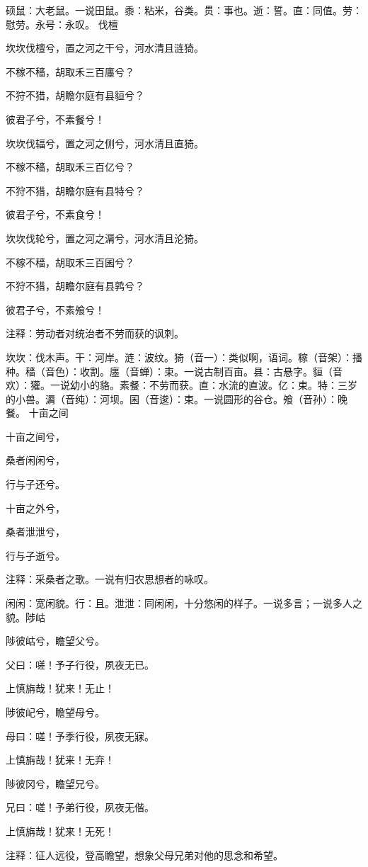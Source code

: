 \documentclass[12pt,UTF8]{ctexbook}
\begin{document}
硕鼠：大老鼠。一说田鼠。黍：粘米，谷类。贯：事也。逝：誓。直：同值。劳：慰劳。永号：永叹。 伐檀

坎坎伐檀兮，置之河之干兮，河水清且涟猗。

不稼不穑，胡取禾三百廛兮？

不狩不猎，胡瞻尔庭有县貆兮？

彼君子兮，不素餐兮！

坎坎伐辐兮，置之河之侧兮，河水清且直猗。

不稼不穑，胡取禾三百亿兮？

不狩不猎，胡瞻尔庭有县特兮？

彼君子兮，不素食兮！

坎坎伐轮兮，置之河之漘兮，河水清且沦猗。

不稼不穑，胡取禾三百囷兮？

不狩不猎，胡瞻尔庭有县鹑兮？

彼君子兮，不素飧兮！

注释：劳动者对统治者不劳而获的讽刺。

坎坎：伐木声。干：河岸。涟：波纹。猗（音一）：类似啊，语词。稼（音架）：播种。穑（音色）：收割。廛（音蝉）：束。一说古制百亩。县：古悬字。貆（音欢）：獾。一说幼小的貉。素餐：不劳而获。直：水流的直波。亿：束。特：三岁的小兽。漘（音纯）：河坝。囷（音逡）：束。一说圆形的谷仓。飧（音孙）：晚餐。 十亩之间

十亩之间兮，

桑者闲闲兮，

行与子还兮。

十亩之外兮，

桑者泄泄兮，

行与子逝兮。

注释：采桑者之歌。一说有归农思想者的咏叹。

闲闲：宽闲貌。行：且。泄泄：同闲闲，十分悠闲的样子。一说多言；一说多人之貌。陟岵

陟彼岵兮，瞻望父兮。

父曰：嗟！予子行役，夙夜无已。

上慎旃哉！犹来！无止！

陟彼屺兮，瞻望母兮。

母曰：嗟！予季行役，夙夜无寐。

上慎旃哉！犹来！无弃！

陟彼冈兮，瞻望兄兮。

兄曰：嗟！予弟行役，夙夜无偕。

上慎旃哉！犹来！无死！

注释：征人远役，登高瞻望，想象父母兄弟对他的思念和希望。
\end{document}
